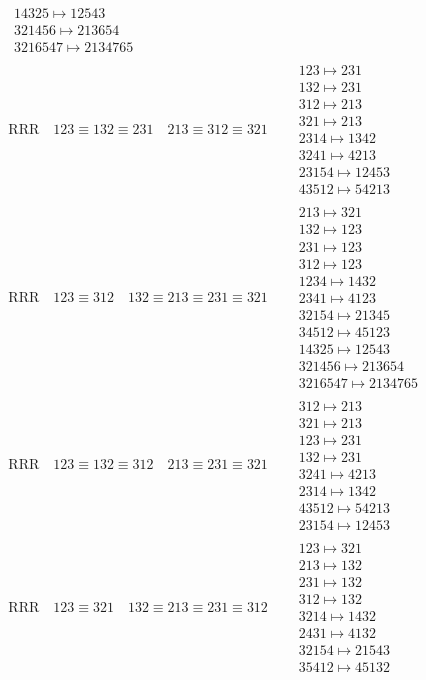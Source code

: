 \documentclass{article}
\begin{document}
\begin{align}
\begin{matrix}
14325 \mapsto 12543
\\
321456 \mapsto 213654
\\
3216547 \mapsto 2134765
\end{matrix}
\\
\text{RRR}
\quad
123\equiv132\equiv231
\quad
213\equiv312\equiv321
\quad
&
\begin{matrix}
123 \mapsto 231
\\
132 \mapsto 231
\\
312 \mapsto 213
\\
321 \mapsto 213
\\
2314 \mapsto 1342
\\
3241 \mapsto 4213
\\
23154 \mapsto 12453
\\
43512 \mapsto 54213
\end{matrix}
\\
\text{RRR}
\quad
123\equiv312
\quad
132\equiv213\equiv231\equiv321
\quad
&
\begin{matrix}
213 \mapsto 321
\\
132 \mapsto 123
\\
231 \mapsto 123
\\
312 \mapsto 123
\\
1234 \mapsto 1432
\\
2341 \mapsto 4123
\\
32154 \mapsto 21345
\\
34512 \mapsto 45123
\\
14325 \mapsto 12543
\\
321456 \mapsto 213654
\\
3216547 \mapsto 2134765
\end{matrix}
\\
\text{RRR}
\quad
123\equiv132\equiv312
\quad
213\equiv231\equiv321
\quad
&
\begin{matrix}
312 \mapsto 213
\\
321 \mapsto 213
\\
123 \mapsto 231
\\
132 \mapsto 231
\\
3241 \mapsto 4213
\\
2314 \mapsto 1342
\\
43512 \mapsto 54213
\\
23154 \mapsto 12453
\end{matrix}
\\
\text{RRR}
\quad
123\equiv321
\quad
132\equiv213\equiv231\equiv312
\quad
&
\begin{matrix}
123 \mapsto 321
\\
213 \mapsto 132
\\
231 \mapsto 132
\\
312 \mapsto 132
\\
3214 \mapsto 1432
\\
2431 \mapsto 4132
\\
32154 \mapsto 21543
\\
35412 \mapsto 45132
\end{matrix}
\end{align}
\end{document}
